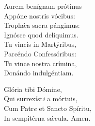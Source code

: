Aurem benígnam prótinus\\
Appóne nostris vócibus:\\
Trophǽa sacra pángimus:\\
Ignósce quod delíquimus.\\

Tu vincis in Martýribus,\\
Parcéndo Confessóribus:\\
Tu vince nostra crímina,\\
Donándo indulgéntiam.

Glória tibi Dómine,\\
Qui surrexíst\textit{i} a mórtuis,\\
Cum Patr\textit{e} et Sa\-ncto Spíritu,\\
In sempitérna sǽcula.
Amen.